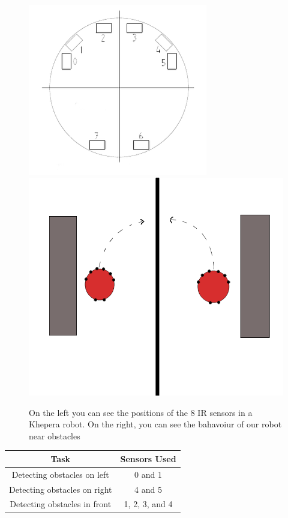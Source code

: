 \documentclass[]{article}
\begin{document}
\begin{figure}[h]
 \includegraphics[scale=0.5]{IRSensors}
 \includegraphics[scale=0.25]{obstacles}
 \centering
 \caption{On the left you can see the positions of the 8 IR sensors in a Khepera robot. On the right, you can see the bahavoiur of our robot near obstacles}
 \end{figure}

\begin{center}
\begin{tabular}{|c|c|}
 \hline
 \textbf{Task} & \textbf{Sensors Used}  \\
 \hline
 Detecting obstacles on left & 0 and 1 \\
 Detecting obstacles on right & 4 and 5 \\
 Detecting obstacles in front & 1, 2, 3, and 4 \\
 \hline
\end{tabular}
\end{center}
\end{document}
